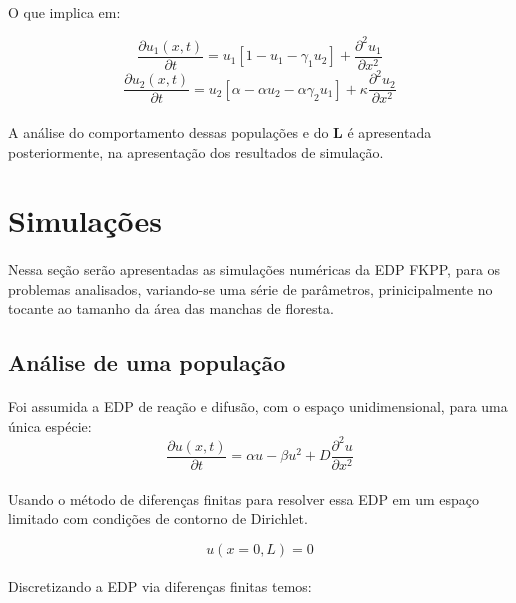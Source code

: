 \documentclass{article}
\begin{document}
	 \paragraph{}
	 O que implica em:
	 
	 $$ \frac{\partial u_1(x,t)}{\partial t} = u_1 \left[1 - u_1  - \gamma_1 u_2 \right] +  \frac{\partial^2 u_1}{\partial x^2}$$
	 $$ \frac{\partial u_2(x,t)}{\partial t} = u_2 \left[\alpha - \alpha u_2  - \alpha \gamma_2 u_1 \right] + \kappa \frac{\partial^2 u_2}{\partial x^2} $$
	 
	 \paragraph{}
	 A análise do comportamento dessas populações e do \textbf{L} é apresentada posteriormente, na apresentação dos resultados de simulação.
	 
	 \section{Simulações}
	 
	 \paragraph{}
	 Nessa seção serão apresentadas as simulações numéricas da EDP FKPP, para os problemas analisados, variando-se uma série de parâmetros, prinicipalmente no tocante ao tamanho da área das manchas de floresta.
	 
	 \subsection{Análise de uma população}
	 \paragraph{}
	 Foi assumida a EDP de reação e difusão, com o espaço unidimensional, para uma única espécie:
	 $$ \frac{\partial u(x,t)}{\partial t} = \alpha u - \beta u^2 + D \frac{\partial^2 u}{\partial x^2}  $$
	 
	 \paragraph{}
	 Usando o método de diferenças finitas para resolver essa EDP em um espaço limitado com condições de contorno de Dirichlet.
	 
	 $$u(x=0,L) = 0 $$
	 
	 \paragraph{}
	 Discretizando a EDP via diferenças finitas temos:
	 
\end{document}
